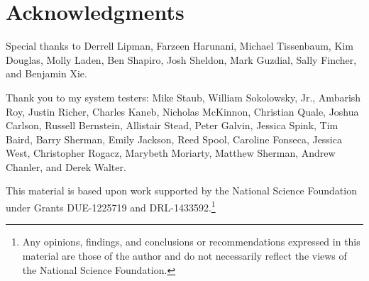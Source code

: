 \chapter*{Acknowledgments}
\renewcommand{\thefootnote}{\fnsymbol{footnote}}


Special thanks to Derrell Lipman, Farzeen Harunani, Michael Tissenbaum, Kim Douglas, Molly Laden, Ben Shapiro, Josh Sheldon, Mark Guzdial, Sally Fincher, and Benjamin Xie.

Thank you to my system testers: Mike Staub, William Sokolowsky, Jr., Ambarish Roy, Justin Richer, Charles Kaneb, Nicholas McKinnon, Christian Quale, Joshua Carlson, Russell Bernstein, Allistair Stead, Peter Galvin, Jessica Spink, Tim Baird, Barry Sherman, Emily Jackson, Reed Spool, Caroline Fonseca, Jessica West, Christopher Rogacz, Marybeth Moriarty, Matthew Sherman, Andrew Chanler, and Derek Walter.

This material is based upon work supported by the National Science Foundation under Grants DUE-1225719 and DRL-1433592.\footnote{Any opinions, findings, and conclusions or recommendations expressed in this material are those of the author and do not necessarily reflect the views of the National Science Foundation.}

\renewcommand{\thefootnote}{\arabic{footnote}}